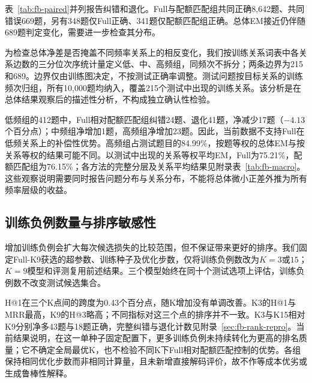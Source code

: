 表~\ref{tab:fb-paired}并列报告纠错和退化。Full与配额匹配组共同正确8,642题、共同错误669题，另有348题仅Full正确、341题仅配额匹配组正确。总体EM接近仍伴随689题判定变化，需要进一步检查其分布。



为检查总体净差是否掩盖不同频率关系上的相反变化，我们按训练关系词表中各关系边数的三分位次序统计量定义低、中、高频组，同频次不拆分；两条边界为215和689。边界仅由训练图决定，不按测试正确率调整。测试问题按目标关系的训练频次归组，所有10,000题均纳入，覆盖215个测试中出现的训练关系。该分析是在总体结果观察后的描述性分析，不构成独立确认性检验。



低频组的412题中，Full相对配额匹配组纠错24题、退化41题，净减少17题（$-4.13$个百分点）；中频组净增加1题，高频组净增加23题。因此，当前数据不支持Full在低频关系上的补偿性优势。高频组占测试题目的84.99\%，按题等权的总体EM与按关系等权的结果可能不同。以测试中出现的关系等权平均EM，Full为75.21\%，配额匹配组为76.15\%；各方法的完整分层及关系平均结果见附录表~\ref{tab:fb-macro}。这些观察说明需要同时报告问题分布与关系分布，不能将总体微小正差外推为所有频率层级的收益。

\subsection{训练负例数量与排序敏感性}
\label{sec:k-sensitivity}

增加训练负例会扩大每次候选损失的比较范围，但不保证带来更好的排序。我们固定Full-K9获选的超参数、训练种子及优化步数，仅将训练负例数改为$K=3$或$15$；$K=9$模型和评测复用前述结果。三个模型始终在同十个测试选项上评估，训练负例数不改变测试候选集合。



H@1在三个K点间的跨度为0.43个百分点，随K增加没有单调改善。K3的H@1与MRR最高，K9的H@3略高；不同指标对这三个点的排序并不一致。K3与K15相对K9分别净多43题与18题正确，完整纠错与退化计数见附录~\ref{sec:fb-rank-repro}。当前结果说明，在这一单种子固定配置下，更多训练负例未持续转化为更高的排名质量；它不确定全局最优K，也不检验不同K下Full相对配额匹配控制的优势。各组保持相同优化步数而非相同计算量，且未新增直接解码评价，故不作等成本优劣或生成鲁棒性解释。
